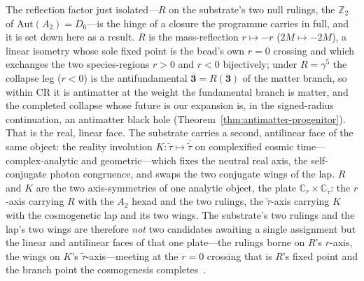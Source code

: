 \documentclass[11pt,a4paper]{article}
\theoremstyle{plain}
\theoremstyle{definition}
\theoremstyle{remark}
\begin{document}
The reflection factor just isolated---$R$ on the substrate's two null rulings, the $\mathbb{Z}_2$ of $\mathrm{Aut}(A_2)=D_6$---is the hinge of a closure the programme carries in full, and it is set down here as a result. $R$ is the mass-reflection $r\mapsto-r$ ($2M\mapsto-2M$), a linear isometry whose sole fixed point is the bead's own $r=0$ crossing and which exchanges the two species-regions $r>0$ and $r<0$ bijectively; under $R=\gamma^5$ the collapse leg ($r<0$) is the antifundamental $\bar{\mathbf 3}=R(\mathbf 3)$ of the matter branch, so within CR it is antimatter at the weight the fundamental branch is matter, and the completed collapse whose future is our expansion is, in the signed-radius continuation, an antimatter black hole (Theorem~\ref{thm:antimatter-progenitor}). That is the real, linear face. The substrate carries a second, antilinear face of the same object: the reality involution $K:\tilde\tau\mapsto\bar{\tilde\tau}$ on complexified cosmic time---complex-analytic and geometric---which fixes the neutral real axis, the self-conjugate photon congruence, and swaps the two conjugate wings of the lap. $R$ and $K$ are the two axis-symmetries of one analytic object, the plate $\mathbb{C}_r\times\mathbb{C}_{\tilde\tau}$: the $r$-axis carrying $R$ with the $A_2$ hexad and the two rulings, the $\tilde\tau$-axis carrying $K$ with the cosmogenetic lap and its two wings. The substrate's two rulings and the lap's two wings are therefore \emph{not} two candidates awaiting a single assignment but the linear and antilinear faces of that one plate---the rulings borne on $R$'s $r$-axis, the wings on $K$'s $\tilde\tau$-axis---meeting at the $r=0$ crossing that is $R$'s fixed point and the branch point the cosmogenesis completes~\cite{JanzenBoundary}.
\end{document}
